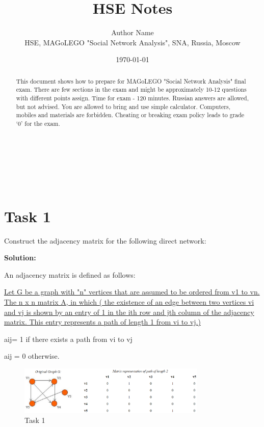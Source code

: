 \documentclass{cernatsnote}
\title{HSE Notes}
\author{
	Author Name \; \\		
	HSE, MAGoLEGO "Social Network Analysis", SNA, Russia, Moscow
}
\date{\today}
\begin{document}
\maketitle

\begin{abstract}
This document shows how to prepare for MAGoLEGO "Social Network Analysis" final exam. There are few sections in the exam and might be approximately 10-12 questions with different points assign. Time for exam - 120 minutes. Russian answers are allowed, but not advised. You are allowed to bring and use simple calculator. Computers, mobiles and materials are forbidden. Cheating or breaking exam policy leads to grade ‘0’ for the exam.
\end{abstract}
\\ \\ \\ 
\begingroup
\color{black}
\tableofcontents
\endgroup

\section{Task 1}
Construct the adjacency matrix for the following direct network:

\textbf{Solution:}
\par An adjacency matrix is defined as follows: 
\par \href{http://ceadserv1.nku.edu/longa//classes/mat385_resources/docs/matrix.html}{Let G be a graph with "n" vertices that are assumed to be ordered from v1 to vn. The n x n matrix A, in which ( the existence of an edge between two vertices vi and vj is shown by an entry of 1 in the ith row and jth column of the adjacency matrix. This entry represents a path of length 1 from vi to vj.)}
\par aij= 1 if there exists a path from vi to vj 
\par aij = 0 otherwise.

\begin{figure}[h]
\centering
\includegraphics[width=0.8\textwidth]{images/task1.png}
\caption{\label{fig:task1} Task 1}
\end{figure}
\end{document}
